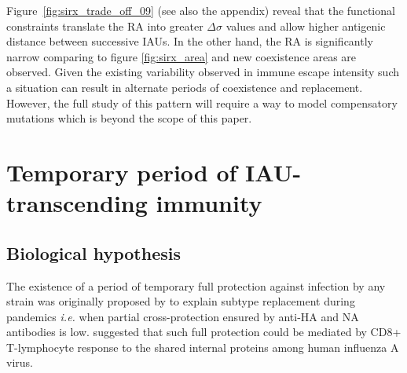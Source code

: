 Figure~\ref{fig:sirx_trade_off_09} (see also the appendix) reveal that
the functional constraints translate the RA into greater
$\Delta\sigma$ values and allow higher antigenic distance between
successive IAUs. In the other hand, the RA is significantly narrow
comparing to figure \ref{fig:sirx_area} and new coexistence areas are
observed. Given the existing variability observed in immune escape
intensity such a situation can result in alternate periods of
coexistence and replacement. However, the full study of this pattern
will require a way to model compensatory mutations which is beyond the
scope of this paper.


\section{Temporary period of IAU-transcending immunity}


\subsection{Biological hypothesis}
\label{sec:Q}

The existence of a period of temporary full protection against infection by any strain was
originally proposed by \citet{Webster1992} to explain subtype
replacement during pandemics \textit{i.e.} when partial
cross-protection ensured by anti-HA and NA antibodies is low.
\citet{Webster1992} suggested that such full protection
could be mediated by CD8+ T-lymphocyte response to the shared internal
proteins among human influenza A virus.

